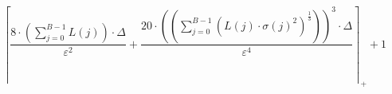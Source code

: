 \[\left\lceil \frac{8 \cdot \left(\sum_{j=0}^{B-1} L\left(j\right)\right) \cdot \Delta}{\varepsilon^{2}} + \frac{20 \cdot \left(\left(\sum_{j=0}^{B-1} \left(L\left(j\right) \cdot \sigma\left(j\right)^{2}\right)^{\frac{1}{3}}\right)\right)^{3} \cdot \Delta}{\varepsilon^{4}} \right\rceil_{+} + 1\]
